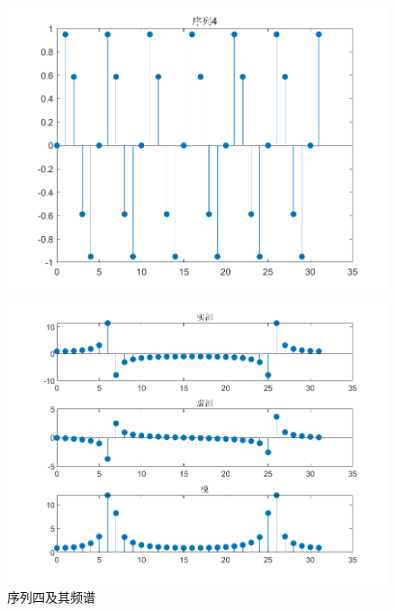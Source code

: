 \documentclass{../source/zjureport}
\begin{document}
            \begin{figure}[H]
                \centering
                \begin{minipage}[t]{0.48\textwidth}
                \centering
                \includegraphics[width=\textwidth]{figure/序列4.png}
                \end{minipage}
                \begin{minipage}[t]{0.48\textwidth}
                \centering
                \includegraphics[width=\textwidth]{figure/频谱_序列4.png}
                \end{minipage}
                \caption{序列四及其频谱}
            \end{figure}
\end{document}
